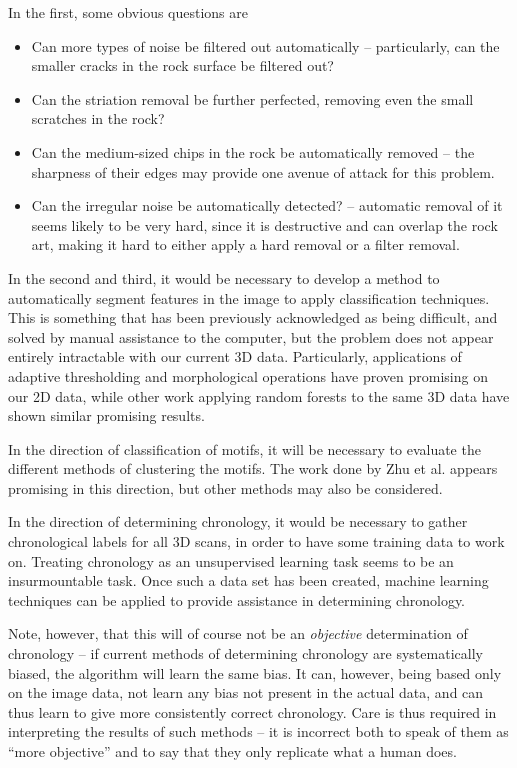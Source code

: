 \documentclass[a4paper,reqno,oneside]{amsart} %
\theoremstyle{definition}
\theoremstyle{remark}
\numberwithin{equation}{section}
\begin{document}
In the first, some obvious questions are
\begin{itemize}
    \item Can more types of noise be filtered out automatically -- particularly, can the smaller cracks in the rock surface be filtered out? 
    \item Can the striation removal be further perfected, removing even the small scratches in the rock?
    \item Can the medium-sized chips in the rock be automatically removed -- the sharpness of their edges may provide one avenue of attack for this problem.
    \item Can the irregular noise be automatically detected? -- automatic removal of it seems likely to be very hard, since it is destructive and can overlap the rock art, making it hard to either apply a hard removal or a filter removal.
\end{itemize}

In the second and third, it would be necessary to develop a method to automatically segment features in the image to apply classification techniques. This is something that has been previously acknowledged as being difficult, and solved by manual assistance to the computer\cite{towindexing,kohonen}, but the problem does not appear entirely intractable with our current 3D data. Particularly, applications of adaptive thresholding and morphological operations have proven promising on our 2D data, while other work applying random forests to the same 3D data have shown similar promising results.

In the direction of classification of motifs, it will be necessary to evaluate the different methods of clustering the motifs. The work done by Zhu et al.\cite{towindexing} appears promising in this direction, but other methods may also be considered.

In the direction of determining chronology, it would be necessary to gather chronological labels for all 3D scans, in order to have some training data to work on. Treating chronology as an unsupervised learning task seems to be an insurmountable task. Once such a data set has been created, machine learning techniques can be applied to provide assistance in determining chronology. 

Note, however, that this will of course not be an \emph{objective} determination of chronology -- if current methods of determining chronology are systematically biased, the algorithm will learn the same bias. It can, however, being based only on the image data, not learn any bias not present in the actual data, and can thus learn to give more consistently correct chronology. Care is thus required in interpreting the results of such methods -- it is incorrect both to speak of them as ``more objective'' and to say that they only replicate what a human does.
\end{document}
